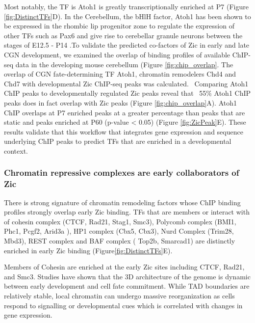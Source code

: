 \documentclass[fleqn,10pt,twocolumn]{wlscirep}
\begin{document}
Most notably, the TF is Atoh1 is greatly transcriptionally enriched at P7 (Figure \ref{fig:DistinctTFs}D). In the Cerebellum, the bHlH factor, Atoh1 has been shown to be expressed in the rhombic lip progenitor zone to regulate the expression of other TFs such as Pax6 and give rise to cerebellar granule neurons between the stages of E12.5 - P14 \cite{Aruga2018ZicDisease, Yeung2014WlsDevelopment, Wang2005Math1Cerebellum, Ben-Arie1997Math1Neurons}.To validate the predicted co-factors of Zic in early and late CGN development, we examined the overlap of binding profiles of available ChIP-seq data in the developing mouse cerebellum  (Figure \ref{fig:chip_overlap}. The overlap of CGN fate-determining TF Atoh1, chromatin remodelers Chd4 and Chd7 with developmental Zic ChIP-seq peaks was calculated. \ Comparing Atoh1 ChIP peaks to developmentally regulated Zic peaks reveal that ~55\%  Atoh1 ChIP peaks does in fact overlap with Zic peaks (Figure \ref{fig:chip_overlap}A). Atoh1 ChIP overlaps at P7 enriched peaks at a greater percentage than peaks that are static and peaks enriched at P60 (p-value < 0.05) (Figure \ref{fig:ZicPeak}E). These results validate that this workflow that integrates gene expression and sequence underlying ChIP peaks to predict TFs that are enriched in a developmental context.


\subsubsection*{Chromatin repressive complexes are early collaborators of Zic}
There is strong signature of chromatin remodeling factors whose ChIP binding profiles strongly overlap early Zic binding. TFs that are members or interact with of cohesin complex  (CTCF, Rad21, Stag1, Smc3), Polycomb  complex (BMI1, Phc1, Pcgf2, Arid3a ), HP1 complex (Cbx5, Cbx3), Nurd Complex (Trim28, Mbd3), REST complex and BAF complex ( Top2b, Smarcad1) are distinctly enriched in early Zic binding (Figure\ref{fig:DistinctTFs}E). 

Members of Cohesin are enriched at the early Zic sites including CTCF, Rad21, and Smc3. Studies have shown that the 3D architecture of the genome is dynamic between early development and cell fate commitment. While TAD boundaries are relatively stable, local chromatin can undergo massive reorganization as cells respond to signalling or developmental cues which is correlated with changes in gene expression\cite{Zheng2019TheDifferentiaition, Bonev2016OrganizationGenome}. 
\end{document}
